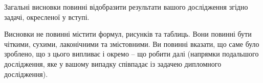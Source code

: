 Загальні висновки повинні відобразити результати вашого дослідження згідно 
задачі, окресленої у вступі.

Висновки не повинні містити формул, рисунків та таблиць. Вони повинні бути 
чіткими, сухими, лаконічними та змістовними. Ви повинні вказати, що саме 
було зроблено, що з цього випливає і окремо -- що робити далі (напрямки 
подальшого дослідження, яке у вашому випадку співпадає із задачею 
дипломного дослідження).
